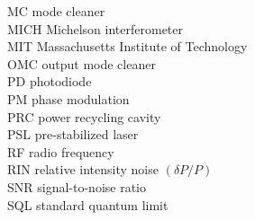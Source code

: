 \begin{tabbing}
MC   \> mode cleaner \\
MICH \> Michelson interferometer \\
MIT  \> Massachusetts Institute of Technology \\
OMC  \> output mode cleaner \\
PD   \> photodiode \\
PM   \> phase modulation \\
PRC  \> power recycling cavity \\
PSL  \> pre-stabilized laser \\
RF   \> radio frequency \\
RIN  \> relative intensity noise $(\delta P/P)$ \\
SNR  \> signal-to-noise ratio \\
SQL  \> standard quantum limit
\end{tabbing}

